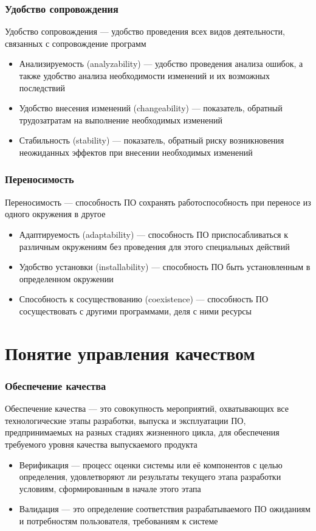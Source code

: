 \documentclass{../industrial-development}
\begin{document}
	\begin{frame} \frametitle {Удобство сопровождения}
		\begin{block}{}
			\alert{Удобство сопровождения} --- удобство проведения всех видов деятельности, связанных с сопровождение программ
		\end{block}
		\begin{itemize}
			\item Анализируемость (analyzability) --- удобство проведения анализа ошибок, а также удобство анализа необходимости изменений и их возможных последствий
			\item Удобство внесения изменений (changeability) --- показатель, обратный трудозатратам на выполнение необходимых изменений
			\item Стабильность (stability) --- показатель, обратный риску возникновения неожиданных эффектов при внесении необходимых изменений
		\end{itemize}
	\end{frame}	
	
	\begin{frame} \frametitle {Переносимость}
		\begin{block}{}
			\alert{Переносимость} --- способность ПО сохранять работоспособность при переносе из одного окружения в другое
		\end{block}
		\begin{itemize}
			\item Адаптируемость (adaptability) --- способность ПО приспосабливаться к различным окружениям без проведения для этого специальных действий
			\item Удобство установки (installability) --- способность ПО быть установленным в определенном окружении
			\item Способность к сосуществованию (coexistence) --- способность ПО сосуществовать с другими программами, деля с ними ресурсы
		\end{itemize}
	\end{frame}	
	
	\section{Понятие управления качеством}
	\begin{frame} \frametitle {Обеспечение качества}
		\begin{block}{}
			\alert{Обеспечение качества} --- это совокупность мероприятий, охватывающих все технологические этапы разработки, выпуска и эксплуатации ПО, предпринимаемых на разных стадиях жизненного цикла, для обеспечения требуемого уровня качества выпускаемого продукта	
		\end{block}
		\begin{itemize}
			\item Верификация --- процесс оценки системы или её компонентов с целью определения, удовлетворяют ли результаты текущего этапа разработки условиям, сформированным в начале этого этапа
			\item Валидация --- это определение соответствия разрабатываемого ПО ожиданиям и потребностям пользователя, требованиям к системе
		\end{itemize}
	\end{frame}	
	
\end{document}
